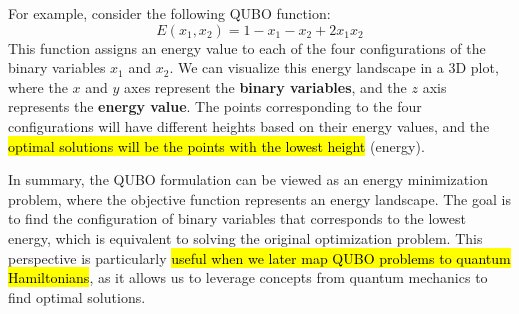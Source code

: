 \begin{examplebox}
    For example, consider the following QUBO function:
    \begin{equation*}
        E(x_1, x_2) = 1 - x_1 - x_2 + 2x_1 x_2
    \end{equation*}
    This function assigns an energy value to each of the four configurations of the binary variables $x_1$ and $x_2$. We can visualize this energy landscape in a 3D plot, where the $x$ and $y$ axes represent the \textbf{binary variables}, and the $z$ axis represents the \textbf{energy value}. The points corresponding to the four configurations will have different heights based on their energy values, and the \hl{optimal solutions will be the points with the lowest height} (energy).

    \begin{center}
    \end{center}
\end{examplebox}

\noindent
In summary, the QUBO formulation can be viewed as an energy minimization problem, where the objective function represents an energy landscape. The goal is to find the configuration of binary variables that corresponds to the lowest energy, which is equivalent to solving the original optimization problem. This perspective is particularly \hl{useful when we later map QUBO problems to quantum Hamiltonians}, as it allows us to leverage concepts from quantum mechanics to find optimal solutions.